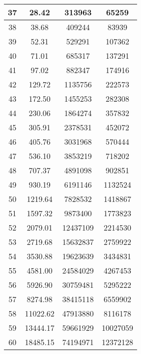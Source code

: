 \begin{tabular}{|c|c|c|c|}
37 & 28.42 & 313963 & 65259\\ \hline
38 & 38.68 & 409244 & 83939\\ \hline
39 & 52.31 & 529291 & 107362\\ \hline
40 & 71.01 & 685317 & 137291\\ \hline
41 & 97.02 & 882347 & 174916\\ \hline
42 & 129.72 & 1135756 & 222573\\ \hline
43 & 172.50 & 1455253 & 282308\\ \hline
44 & 230.06 & 1864274 & 357832\\ \hline
45 & 305.91 & 2378531 & 452072\\ \hline
46 & 405.76 & 3031968 & 570444\\ \hline
47 & 536.10 & 3853219 & 718202\\ \hline
48 & 707.37 & 4891098 & 902851\\ \hline
49 & 930.19 & 6191146 & 1132524\\ \hline
50 & 1219.64 & 7828532 & 1418867\\ \hline
51 & 1597.32 & 9873400 & 1773823\\ \hline
52 & 2079.01 & 12437109 & 2214530\\ \hline
53 & 2719.68 & 15632837 & 2759922\\ \hline
54 & 3530.88 & 19623639 & 3434831\\ \hline
55 & 4581.00 & 24584029 & 4267453\\ \hline
56 & 5926.90 & 30759481 & 5295222\\ \hline
57 & 8274.98 & 38415118 & 6559902\\ \hline
58 & 11022.62 & 47913880 & 8116178\\ \hline
59 & 13444.17 & 59661929 & 10027059\\ \hline
60 & 18485.15 & 74194971 & 12372128\\ \hline

\end{tabular}

